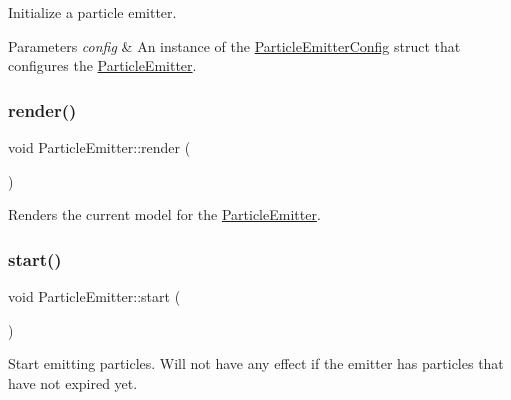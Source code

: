 Initialize a particle emitter. 


\begin{DoxyParams}{Parameters}
{\em config} & An instance of the \hyperlink{struct_mason_1_1_particle_emitter_config}{Particle\+Emitter\+Config} struct that configures the \hyperlink{class_mason_1_1_particle_emitter}{Particle\+Emitter}. \\
\hline
\end{DoxyParams}
\hypertarget{class_mason_1_1_particle_emitter_aa3b6ee77d7b15e2064003d8f75d53774}{}\label{class_mason_1_1_particle_emitter_aa3b6ee77d7b15e2064003d8f75d53774} 
\subsubsection{\texorpdfstring{render()}{render()}}
{\footnotesize\ttfamily void Particle\+Emitter\+::render (\begin{DoxyParamCaption}{ }\end{DoxyParamCaption})}



Renders the current model for the \hyperlink{class_mason_1_1_particle_emitter}{Particle\+Emitter}. 

\hypertarget{class_mason_1_1_particle_emitter_aba4bcba68194e57b715779426ce68a19}{}\label{class_mason_1_1_particle_emitter_aba4bcba68194e57b715779426ce68a19} 
\subsubsection{\texorpdfstring{start()}{start()}}
{\footnotesize\ttfamily void Particle\+Emitter\+::start (\begin{DoxyParamCaption}{ }\end{DoxyParamCaption})}



Start emitting particles. Will not have any effect if the emitter has particles that have not expired yet. 

\hypertarget{class_mason_1_1_particle_emitter_a4843aa3afd1c4d49c9c2519837fffe81}{}\label{class_mason_1_1_particle_emitter_a4843aa3afd1c4d49c9c2519837fffe81} 
